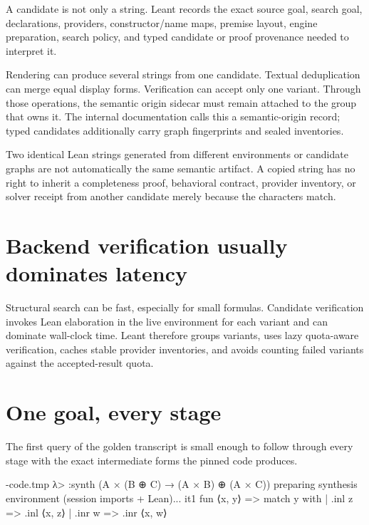 \documentclass[10pt,letterpaper,oneside,openany]{report}
\newcommand{\CodeTitle}{Lean}
\newenvironment{leanblock}[1][Lean]
  {\def\CodeTitle{#1}\VerbatimEnvironment\begin{VerbatimOut}{\jobname-code.tmp}}
  {\end{VerbatimOut}
   \begin{tcolorbox}[colback=CodeBack,colframe=Rule,colbacktitle=SageDark,title={\CodeTitle},
     sharp corners=south,breakable=false]
   \VerbatimInput[fontsize=\small,breaklines=true,breakanywhere=true,tabsize=2]{\jobname-code.tmp}
   \end{tcolorbox}}
\begin{document}
A candidate is not only a string.  Leant records the exact source goal, search goal, declarations, providers, constructor/name maps, premise layout, engine preparation, search policy, and typed candidate or proof provenance needed to interpret it.

Rendering can produce several strings from one candidate.  Textual deduplication can merge equal display forms.  Verification can accept only one variant.  Through those operations, the semantic origin sidecar must remain attached to the group that owns it.  The internal documentation calls this a semantic-origin record; typed candidates additionally carry graph fingerprints and sealed inventories.

\begin{warningbox}
Two identical Lean strings generated from different environments or candidate graphs are not automatically the same semantic artifact.  A copied string has no right to inherit a completeness proof, behavioral contract, provider inventory, or solver receipt from another candidate merely because the characters match.
\end{warningbox}

\section{Backend verification usually dominates latency}

Structural search can be fast, especially for small formulas.  Candidate verification invokes Lean elaboration in the live environment for each variant and can dominate wall-clock time.  Leant therefore groups variants, uses lazy quota-aware verification, caches stable provider inventories, and avoids counting failed variants against the accepted-result quota.

\section{One goal, every stage}\label{sec:one-goal}

The first query of the golden transcript  is small enough to follow through every stage with the exact intermediate forms the pinned code produces.

\begin{leanblock}[Transcript]
λ> :synth (A × (B ⊕ C) → (A × B) ⊕ (A × C))
preparing synthesis environment (session imports + Lean)...
  it1  fun ⟨x, y⟩ => match y with | .inl z => .inl ⟨x, z⟩ | .inr w => .inr ⟨x, w⟩
\end{leanblock}
\end{document}
